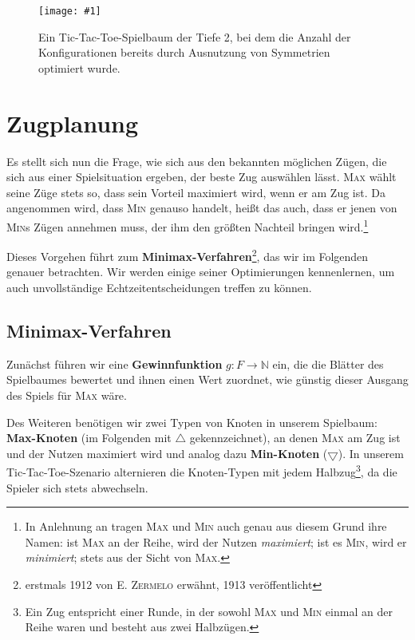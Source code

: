 \documentclass[a4paper]{scrartcl}
\newcommand\g[4]{%
  \begin{figure}[!ht]
  \centering
  \texttt{[image: \#1]}
  \caption{#3\label{fig:#2}}
  \end{figure}}
\begin{document}
\g{tic.pdf}{tictactoe}{Ein Tic-Tac-Toe-Spielbaum der Tiefe 2, bei dem die Anzahl der Konfigurationen bereits durch Ausnutzung von Symmetrien optimiert wurde.}{.9}

\section{Zugplanung}

Es stellt sich nun die Frage, wie sich aus den bekannten möglichen Zügen, die sich aus einer Spielsituation ergeben, der beste Zug auswählen lässt. \textsc{Max} wählt seine Züge stets so, dass sein Vorteil maximiert wird, wenn er am Zug ist. Da angenommen wird, dass \textsc{Min} genauso handelt, heißt das auch, dass er jenen von \textsc{Min}s Zügen annehmen muss, der ihm den größten Nachteil bringen wird.\footnote{In Anlehnung an \cite{russel:2012} tragen \textsc{Max} und \textsc{Min} auch genau aus diesem Grund ihre Namen: ist \textsc{Max} an der Reihe, wird der Nutzen \textit{maximiert}; ist es \textsc{Min}, wird er \textit{minimiert}; stets aus der Sicht von \textsc{Max}.}

Dieses Vorgehen führt zum \textbf{Minimax-Verfahren}\footnote{erstmals 1912 von \textsc{E. Zermelo} erwähnt, 1913 veröffentlicht\cite{zermelo:1913}}, das wir im Folgenden genauer betrachten. Wir werden einige seiner Optimierungen kennenlernen, um auch unvollständige Echtzeitentscheidungen treffen zu können.


\subsection{Minimax-Verfahren}

Zunächst führen wir eine \textbf{Gewinnfunktion} $g: F \to \mathbb{N}$ ein, die die Blätter des Spielbaumes bewertet und ihnen einen Wert zuordnet, wie günstig dieser Ausgang des Spiels für \textsc{Max} wäre.

Des Weiteren benötigen wir zwei Typen von Knoten in unserem Spielbaum: \textbf{Max-Knoten} (im Folgenden mit $\bigtriangleup$ gekennzeichnet), an denen \textsc{Max} am Zug ist und der Nutzen maximiert wird und analog dazu \textbf{Min-Knoten} ($\bigtriangledown$). In unserem Tic-Tac-Toe-Szenario alternieren die Knoten-Typen mit jedem Halbzug\footnote{Ein Zug entspricht einer Runde, in der sowohl \textsc{Max} und \textsc{Min} einmal an der Reihe waren und besteht aus zwei Halbzügen.}, da die Spieler sich stets abwechseln. 
\end{document}
